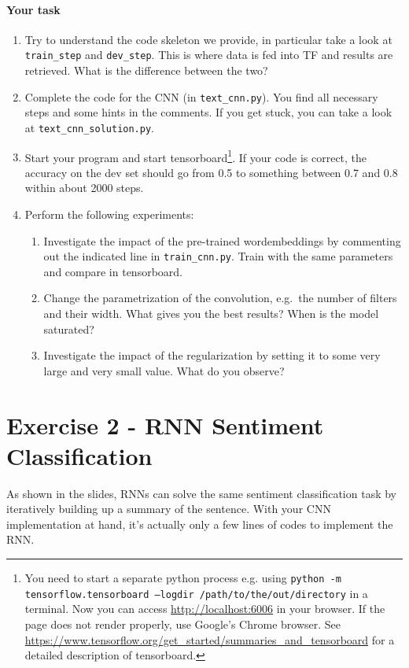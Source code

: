 \documentclass{article}
\begin{document}
\paragraph{Your task}
\begin{enumerate}
	\item Try to understand the code skeleton we provide, in particular take a look at \texttt{train\_step} and \texttt{dev\_step}. This is where data is fed into TF and results are retrieved. What is the difference between the two?
	\item Complete the code for the CNN (in \texttt{text\_cnn.py}). You find all necessary steps and some hints in the comments. If you get stuck, you can take a look at \texttt{text\_cnn\_solution.py}.
	\item Start your program and start tensorboard\footnote{You need to start a separate python process e.g. using \texttt{python -m tensorflow.tensorboard --logdir /path/to/the/out/directory} in a terminal. Now you can access \url{http://localhost:6006} in your browser. If the page does not render properly, use Google's Chrome browser. See \url{https://www.tensorflow.org/get_started/summaries_and_tensorboard} for a detailed description of tensorboard.}. If your code is correct, the accuracy on the dev set should go from 0.5 to something between 0.7 and 0.8 within about 2000 steps.
	\item Perform the following experiments:
	\begin{enumerate}
		\item Investigate the impact of the pre-trained wordembeddings by commenting out the indicated line in \texttt{train\_cnn.py}. Train with the same parameters and compare in tensorboard.
		\item Change the parametrization of the convolution, e.g.\ the number of filters and their width. What gives you the best results? When is the model saturated?
		\item Investigate the impact of the regularization by setting it to some very large and very small value. What do you observe?
\end{enumerate}	 
\end{enumerate}


\section*{Exercise 2 - RNN Sentiment Classification}

As shown in the slides, RNNs can solve the same sentiment classification task by iteratively building up a summary of the sentence. With your CNN implementation at hand, it's actually only a few lines of codes to implement the RNN.
\end{document}
